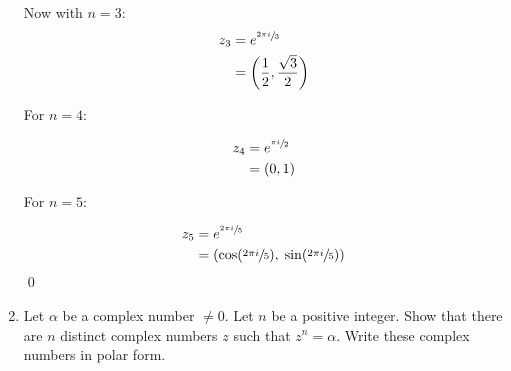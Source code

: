 \begin{enumerate}
	      Now with $n = 3:$
	      \begin{align*}
		      z_3 & = e^{\sfrac{2 \pi i}{3}}                         \\
		          & = \left( \frac{1}{2}, \frac{\sqrt{3}}{2} \right) \\
	      \end{align*}

	      For $n = 4:$

	      \begin{align*}
		      z_4 & = e^{\sfrac{\pi i}{2}} \\
		          & = ( 0, 1 )
	      \end{align*}

	      For $n = 5:$

	      \begin{align*}
		      z_5 & = e^{\sfrac{2 \pi i}{5}}                                              \\
		          & = \left( \cos( \sfrac{2\pi i}{5}), \; \sin(\sfrac{2\pi i}{5}) \right)
	      \end{align*}
	      \qed

	\item Let $\alpha$ be a complex number $\neq 0.$ Let $n$ be a positive integer. Show that there
	      are $n$ distinct complex numbers $z$ such that $z^n = \alpha.$ Write these complex numbers
	      in polar form.


\end{enumerate}
